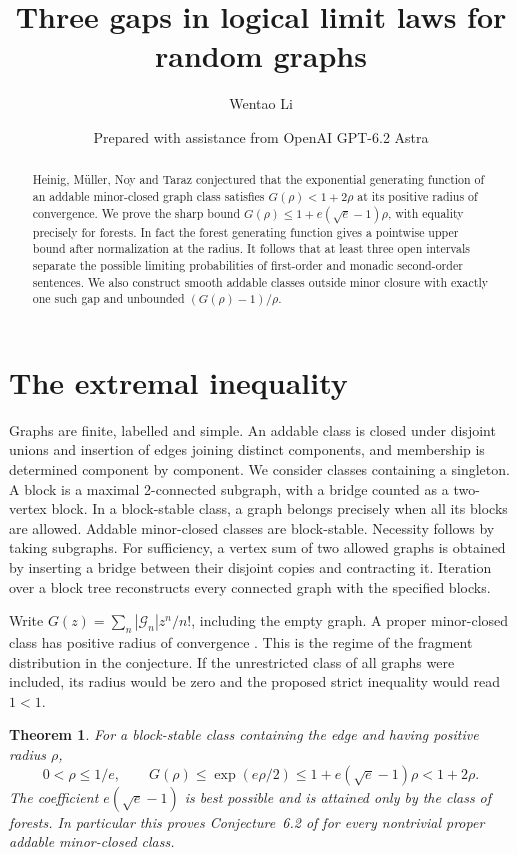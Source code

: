 \documentclass[11pt]{article}
\title{Three gaps in logical limit laws for random graphs}
\author{Wentao Li}
\date{\small Prepared with assistance from OpenAI GPT-6.2 Astra}
\newtheorem{theorem}{Theorem}
\begin{document}
\maketitle
\begin{abstract}
Heinig, M\"uller, Noy and Taraz conjectured that the exponential generating function of an addable minor-closed graph class satisfies $G(\rho)<1+2\rho$ at its positive radius of convergence. We prove the sharp bound $G(\rho)\le 1+e(\sqrt e-1)\rho$, with equality precisely for forests. In fact the forest generating function gives a pointwise upper bound after normalization at the radius. It follows that at least three open intervals separate the possible limiting probabilities of first-order and monadic second-order sentences. We also construct smooth addable classes outside minor closure with exactly one such gap and unbounded $(G(\rho)-1)/\rho$.
\end{abstract}

\section{The extremal inequality}
Graphs are finite, labelled and simple. An addable class is closed under disjoint unions and insertion of edges joining distinct components, and membership is determined component by component. We consider classes containing a singleton. A block is a maximal 2-connected subgraph, with a bridge counted as a two-vertex block. In a block-stable class, a graph belongs precisely when all its blocks are allowed. Addable minor-closed classes are block-stable. Necessity follows by taking subgraphs. For sufficiency, a vertex sum of two allowed graphs is obtained by inserting a bridge between their disjoint copies and contracting it. Iteration over a block tree reconstructs every connected graph with the specified blocks.

Write $G(z)=\sum_n |\mathcal G_n|z^n/n!$, including the empty graph. A proper minor-closed class has positive radius of convergence \cite{hmnt}. This is the regime of the fragment distribution in the conjecture. If the unrestricted class of all graphs were included, its radius would be zero and the proposed strict inequality would read $1<1$.

\begin{theorem}\label{main}
For a block-stable class containing the edge and having positive radius $\rho$,
\[
 0<\rho\le 1/e,\qquad
 G(\rho)\le \exp(e\rho/2)\le 1+e(\sqrt e-1)\rho < 1+2\rho.
\]
The coefficient $e(\sqrt e-1)$ is best possible and is attained only by the class of forests. In particular this proves Conjecture~6.2 of \cite{hmnt} for every nontrivial proper addable minor-closed class.
\end{theorem}
\end{document}
